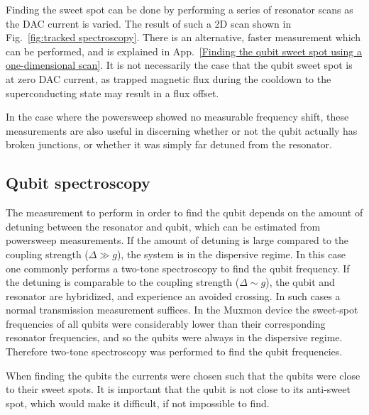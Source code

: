         Finding the sweet spot can be done by performing a series of resonator scans as the DAC current is varied. The result of such a 2D scan shown in Fig.~\ref{fig:tracked spectroscopy}. There is an alternative, faster measurement which can be performed, and is explained in App.~\ref{Finding the qubit sweet spot using a one-dimensional scan}. It is not necessarily the case that the qubit sweet spot is at zero DAC current, as trapped magnetic flux during the cooldown to the superconducting state may result in a flux offset.

        In the case where the powersweep showed no measurable frequency shift, these measurements are also useful in discerning whether or not the qubit actually has broken junctions, or whether it was simply far detuned from the resonator.

      \subsection{Qubit spectroscopy}
        \label{sec:spectroscopy}

        The measurement to perform in order to find the qubit depends on the amount of detuning between the resonator and qubit, which can be estimated from powersweep measurements. If the amount of detuning is large compared to the coupling strength ($\Delta \gg  g$), the system is in the dispersive regime. In this case one commonly performs a two-tone spectroscopy to find the qubit frequency. If the detuning is comparable to the coupling strength ($\Delta \sim g$), the qubit and resonator are hybridized, and experience an avoided crossing. In such cases a normal transmission measurement suffices. In the Muxmon device the sweet-spot frequencies of all qubits were considerably lower than their corresponding resonator frequencies, and so the qubits were always in the dispersive regime. Therefore two-tone spectroscopy was performed to find the qubit frequencies.

        When finding the qubits the currents were chosen such that the qubits were close to their sweet spots. It is important that the qubit is not close to its anti-sweet spot, which would make it difficult, if not impossible to find.

